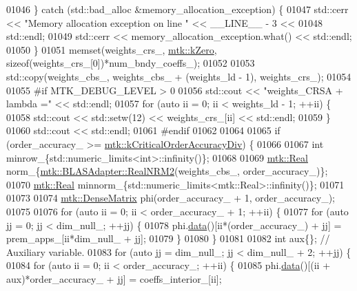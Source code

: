 \begin{DoxyCode}
{{01046   \} \textcolor{keywordflow}{catch} (std::bad\_alloc &memory\_allocation\_exception) \{
01047     std::cerr << \textcolor{stringliteral}{"Memory allocation exception on line "} << \_\_LINE\_\_ - 3 <<
01048       std::endl;
01049     std::cerr << memory\_allocation\_exception.what() << std::endl;
01050   \}
01051   memset(weights\_crs\_, \hyperlink{group__c01-roots_ga59a451a5fae30d59649bcda274fea271}{mtk::kZero}, \textcolor{keyword}{sizeof}(weights\_crs\_[0])*num\_bndy\_coeffs\_);
01052 
01053   std::copy(weights\_cbs\_, weights\_cbs\_ + (weights\_ld - 1), weights\_crs\_);
01054 
01055 \textcolor{preprocessor}{  #if MTK\_DEBUG\_LEVEL > 0}
01056   std::cout << \textcolor{stringliteral}{"weights\_CRSA + lambda ="} << std::endl;
01057   \textcolor{keywordflow}{for} (\textcolor{keyword}{auto} ii = 0; ii < weights\_ld - 1; ++ii) \{
01058     std::cout << std::setw(12) << weights\_crs\_[ii] << std::endl;
01059   \}
01060   std::cout << std::endl;
01061 \textcolor{preprocessor}{  #endif}
01062 
01064 
01065   \textcolor{keywordflow}{if} (order\_accuracy\_ >= \hyperlink{group__c01-roots_ga0898eef2108473e44a5223932d571c31}{mtk::kCriticalOrderAccuracyDiv}) \{
01066 
01067     \textcolor{keywordtype}{int} minrow\_\{std::numeric\_limits<int>::infinity()\};
01068 
01069     \hyperlink{group__c01-roots_gac080bbbf5cbb5502c9f00405f894857d}{mtk::Real} norm\_\{\hyperlink{classmtk_1_1BLASAdapter_ab92440888b730863244c5d9479c11aca}{mtk::BLASAdapter::RealNRM2}(weights\_cbs\_,
      order\_accuracy\_)\};
01070     \hyperlink{group__c01-roots_gac080bbbf5cbb5502c9f00405f894857d}{mtk::Real} minnorm\_\{std::numeric\_limits<mtk::Real>::infinity()\};
01071 
01073 
01074     \hyperlink{classmtk_1_1DenseMatrix}{mtk::DenseMatrix} phi(order\_accuracy\_ + 1, order\_accuracy\_);
01075 
01076     \textcolor{keywordflow}{for} (\textcolor{keyword}{auto} ii = 0; ii < order\_accuracy\_ + 1; ++ii) \{
01077       \textcolor{keywordflow}{for} (\textcolor{keyword}{auto} jj = 0; jj < dim\_null\_; ++jj) \{
01078         phi.\hyperlink{classmtk_1_1DenseMatrix_a16b3ff56feb2658b9fc7147d1de4d8e7}{data}()[ii*(order\_accuracy\_) + jj] = prem\_apps\_[ii*dim\_null\_ + jj];
01079       \}
01080     \}
01081 
01082     \textcolor{keywordtype}{int} aux\{\};  \textcolor{comment}{// Auxiliary variable.}
01083     \textcolor{keywordflow}{for} (\textcolor{keyword}{auto} jj = dim\_null\_; jj < dim\_null\_ + 2; ++jj) \{
01084       \textcolor{keywordflow}{for} (\textcolor{keyword}{auto} ii = 0; ii < order\_accuracy\_; ++ii) \{
01085         phi.\hyperlink{classmtk_1_1DenseMatrix_a16b3ff56feb2658b9fc7147d1de4d8e7}{data}()[(ii + aux)*order\_accuracy\_ + jj] = coeffs\_interior\_[ii];
}}
\end{DoxyCode}
